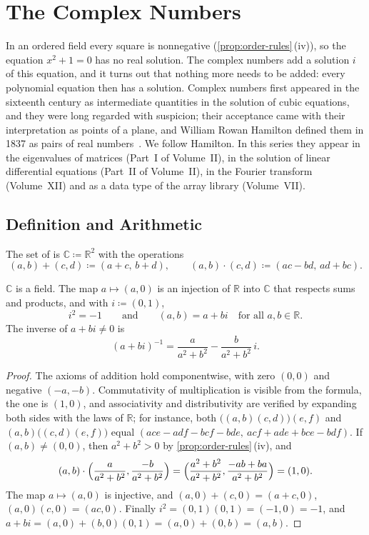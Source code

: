 \section{The Complex Numbers}
\label{sec:complex}

In an ordered field every square is nonnegative (\cref{prop:order-rules}\,(iv)), so the equation $x^2+1=0$ has no real solution. The complex numbers add a solution $i$ of this equation, and it turns out that nothing more needs to be added: every polynomial equation then has a solution. Complex numbers first appeared in the sixteenth century as intermediate quantities in the solution of cubic equations, and they were long regarded with suspicion; their acceptance came with their interpretation as points of a plane, and William Rowan Hamilton defined them in 1837 as pairs of real numbers~\cite{ebbinghaus1991}. We follow Hamilton. In this series they appear in the eigenvalues of matrices (Part~I of Volume~II), in the solution of linear differential equations (Part~II of Volume~II), in the Fourier transform (Volume~XII) and as a data type of the array library (Volume~VII).

\subsection{Definition and Arithmetic}

\begin{definition}
\label{def:complex}
The set of  is $\mathbb C\coloneqq\mathbb R^2$ with the operations
\[
(a,b)+(c,d)\coloneqq(a+c,\,b+d),\qquad(a,b)\cdot(c,d)\coloneqq(ac-bd,\,ad+bc).
\]
\end{definition}

\begin{theorem}
\label{thm:c-field}
$\mathbb C$ is a field. The map $a\mapsto(a,0)$ is an injection of $\mathbb R$ into $\mathbb C$ that respects sums and products, and with $i\coloneqq(0,1)$,
\[
i^2=-1\qquad\text{and}\qquad(a,b)=a+bi\quad\text{for all }a,b\in\mathbb R .
\]
The inverse of $a+bi\ne0$ is
\[
(a+bi)^{-1}=\frac{a}{a^2+b^2}-\frac{b}{a^2+b^2}\,i .
\]
\end{theorem}

\begin{proof}
The axioms of addition hold componentwise, with zero $(0,0)$ and negative $(-a,-b)$. Commutativity of multiplication is visible from the formula, the one is $(1,0)$, and associativity and distributivity are verified by expanding both sides with the laws of $\mathbb R$; for instance, both $\bigl((a,b)(c,d)\bigr)(e,f)$ and $(a,b)\bigl((c,d)(e,f)\bigr)$ equal $(ace-adf-bcf-bde,\ acf+ade+bce-bdf)$. If $(a,b)\ne(0,0)$, then $a^2+b^2>0$ by \cref{prop:order-rules}\,(iv), and
\[
(a,b)\cdot\Bigl(\frac a{a^2+b^2},\frac{-b}{a^2+b^2}\Bigr)=\Bigl(\frac{a^2+b^2}{a^2+b^2},\frac{-ab+ba}{a^2+b^2}\Bigr)=(1,0).
\]
The map $a\mapsto(a,0)$ is injective, and $(a,0)+(c,0)=(a+c,0)$, $(a,0)(c,0)=(ac,0)$. Finally $i^2=(0,1)(0,1)=(-1,0)=-1$, and $a+bi=(a,0)+(b,0)(0,1)=(a,0)+(0,b)=(a,b)$.
\end{proof}

